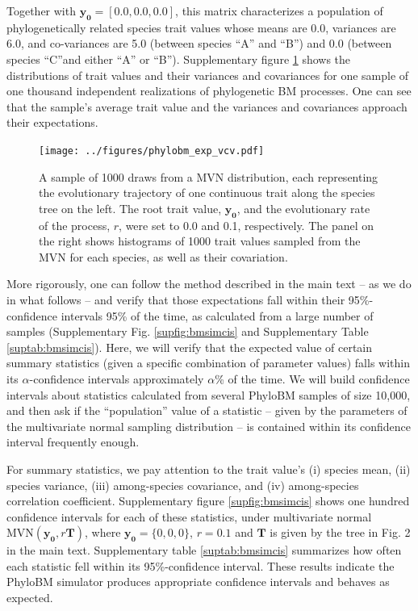 \documentclass[oneside]{article}
\begin{document}
\noindent Together with $\boldsymbol{y_0} = [0.0, 0.0, 0.0]$, this matrix characterizes a population of phylogenetically related species trait values whose means are 0.0, variances are 6.0, and co-variances are 5.0 (between species ``A'' and ``B'') and 0.0 (between species ``C''and either ``A'' or ``B'').
Supplementary figure \ref{fig:bmsim} shows the distributions of trait values and their variances and covariances for one sample of one thousand independent realizations of phylogenetic BM processes. 
One can see that the sample's average trait value and the variances and covariances approach their expectations. 

\begin{figure}[h!]
  \centering
  \texttt{[image: ../figures/phylobm\_exp\_vcv.pdf]}
  \caption{A sample of 1000 draws from a MVN distribution, each representing the evolutionary trajectory of one continuous trait along the species tree on the left.
    The root trait value, $\boldsymbol{y_0}$, and the evolutionary rate of the process, $r$, were set to 0.0 and 0.1, respectively.
    The panel on the right shows histograms of 1000 trait values sampled from the MVN for each species, as well as their covariation.}
  \label{fig:bmsim}
\end{figure}

More rigorously, one can follow the method described in the main text -- as we do in what follows -- and verify that those expectations fall within their 95\%-confidence intervals 95\% of the time, as calculated from a large number of samples (Supplementary Fig. \ref{supfig:bmsimcis} and Supplementary Table \ref{suptab:bmsimcis}).
Here, we will verify that the expected value of certain summary statistics (given a specific combination of parameter values) falls within its $\alpha$-confidence intervals approximately $\alpha$\% of the time.
We will build confidence intervals about statistics calculated from several PhyloBM samples of size 10,000, and then ask if the ``population'' value of  a statistic -- given by the parameters of the multivariate normal sampling distribution -- is contained within its confidence interval frequently enough.

For summary statistics, we pay attention to the trait value's (i) species mean, (ii) species variance, (iii) among-species covariance, and (iv) among-species correlation coefficient.
Supplementary figure \ref{supfig:bmsimcis} shows one hundred confidence intervals for each of these statistics, under multivariate normal $\text{MVN}(\boldsymbol{y_0},r\boldsymbol{T})$, where $\boldsymbol{y_0}=\{0,0,0\}$, $r=0.1$ and $\boldsymbol{T}$ is given by the tree in Fig. 2 in the main text.
Supplementary table \ref{suptab:bmsimcis} summarizes how often each statistic fell within its 95\%-confidence interval.
These results indicate the PhyloBM simulator produces appropriate confidence intervals and behaves as expected.
\end{document}
